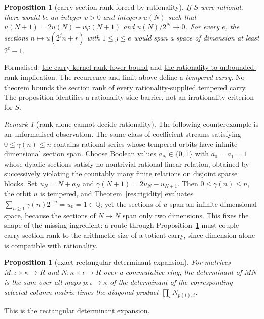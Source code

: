 \documentclass[11pt]{article}
\newcommand{\commit}{bb4e24651b37cd096d3749ef299c3317930b3a3b}
\newcommand{\repobase}{https://github.com/wcook04/plectis-lean-erdos249-257/blob/\commit}
\newcommand{\PK}{Erdos249257}
\newcommand{\lword}[4]{\href{\repobase/\PK/#1\#L#2}{#4}}
\newtheorem{proposition}[theorem]{Proposition}
\theoremstyle{definition}
\theoremstyle{remark}
\newtheorem*{remark}{Remark}
\newcommand{\Q}{\mathbb{Q}}
\newcommand{\ph}{\varphi}
\begin{document}
{\begin{proposition}[carry-section rank forced by rationality]\label{res:carryrank}
If $S$ were rational, there would be an integer $v>0$ and integers $u(N)$ such
that $u(N+1)=2u(N)-v\ph(N+1)$ and $u(N)/2^N\to0$.  For every $e$, the
sections $n\mapsto u(2^jn+r)$ with
$1\leq j\leq e$ would span a space of dimension at least $2^e-1$.
\end{proposition}
\noindent Formalised:
\lword{TotientCarryKernelRigidity.lean}{211}{finrank_canonicalCarryKernel_ge_of_linearIndependent}{the carry-kernel rank lower bound}
and
\lword{TotientCarryKernelRigidity.lean}{300}{not_irrational_totientSeries_implies_unbounded_carryRank_unconditional}{the rationality-to-unbounded-rank implication}.
The recurrence and limit above define a \emph{tempered carry}.  No theorem
bounds the section rank of every rationality-supplied tempered carry.  The
proposition identifies a rationality-side barrier, not an irrationality
criterion for $S$.

\begin{remark}[rank alone cannot decide rationality]
The following counterexample is an unformalised observation.  The same class
of coefficient streams satisfying $0\leq\gamma(n)\leq n$ contains rational
series whose tempered orbits have
infinite-dimensional section span.  Choose Boolean values
\(a_N\in\{0,1\}\) with \(a_0=a_1=1\) whose dyadic sections satisfy no
nontrivial rational linear relation, obtained by successively violating the
countably many finite relations on disjoint sparse blocks.  Set
\(u_N=N+a_N\) and \(\gamma(N+1)=2u_N-u_{N+1}\).  Then
\(0\le\gamma(n)\le n\), the orbit \(u\) is tempered, and
Theorem~\ref{res:rigidity} evaluates
\(\sum_{n\ge1}\gamma(n)2^{-n}=u_0=1\in\Q\); yet the sections of \(u\) span
an infinite-dimensional space, because the sections of \(N\mapsto N\) span
only two dimensions.  This fixes the shape of the missing ingredient: a route through
Proposition~\ref{res:carryrank} must couple carry-section rank to the
arithmetic size of a totient carry, since dimension alone is compatible
with rationality.
\end{remark}

\begin{proposition}[exact rectangular determinant expansion]\label{res:signedmoment}
For matrices $M:\iota\times\kappa\to R$ and
$N:\kappa\times\iota\to R$ over a commutative ring, the determinant of
$MN$ is the sum over all maps $p:\iota\to\kappa$ of the determinant of the
corresponding selected-column matrix times the diagonal product
$\prod_i N_{p(i),i}$.
\end{proposition}
\noindent This is the
\lword{SignedQMomentObstruction.lean}{29}{det_mul_rectangular}{rectangular determinant expansion}.

}
\end{document}
